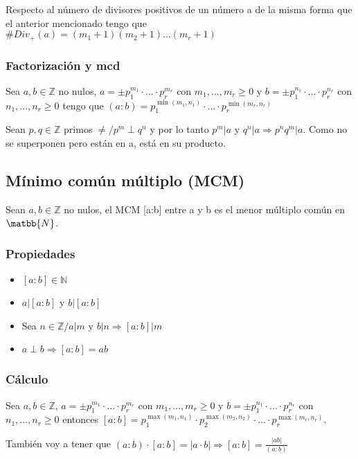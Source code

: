 \documentclass{article}
\newcommand{\card}[1]{\##1}
\begin{document}
Respecto al número de divisores positivos de un número a de la misma forma que el anterior mencionado tengo que $\card{Div_+(a)} = (m_1 + 1)(m_2 + 1)...(m_r + 1)$

\subsubsection{Factorización y mcd}
Sea $a,b \in \mathbb{Z}$ no nulos, $a = \pm p_1^{m_1} \cdot ... \cdot p_r^{m_r}$ con $m_1,...,m_r \geq 0$ y $b = \pm p_1^{n_1} \cdot ... \cdot p_r^{n_r}$ con $n_1,...,n_r \geq 0$ tengo que \begin{math}
    (a:b) = p_1^{\min(m_1, n_1)} \cdot \ldots \cdot p_r^{\min(m_r, n_r)}
\end{math}

Sean $p, q \in \mathbb{Z}$ primos $\neq/ p^m \perp q^n$ y por lo tanto $p^m|a$ y $q^n|a \Rightarrow p^nq^m|a$. Como no se superponen pero están en a, está en su producto.

\subsection{Mínimo común múltiplo (MCM)}
Sean $a,b \in \mathbb{Z}$ no nulos, el MCM [a:b] entre a y b es el menor múltiplo común en $\matbb{N}$.
\subsubsection{Propiedades}
\begin{itemize}
    \item $[a:b] \in \mathbb{N}$
    \item $a|[a:b]$ y $b|[a:b]$
    \item Sea $n \in \mathbb{Z}/a|m \text{ y } b|n \Rightarrow [a:b] | m$
    \item $a \perp b \Rightarrow [a:b] = ab$
\end{itemize}
\subsubsection{Cálculo}
Sea $a,b \in \mathbb{Z}$, $a = \pm p_1^{m_1} \cdot ... \cdot p_r^{m_r}$ con $m_1,...,m_r \geq 0$ y $b = \pm p_1^{n_1} \cdot ... \cdot p_r^{n_r}$ con $n_1,...,n_r \geq 0$ entonces $[a:b] = p_1^{\max(m_1, n_1)} \cdot p_2^{\max(m_2,n_2)} \cdot ... \cdot p_r^{\max(m_r,n_r)}$.

También voy a tener que $(a:b) \cdot [a:b] = |a \cdot b| \Rightarrow [a:b] = \frac{|ab|}{(a:b)}$ 
\end{document}
